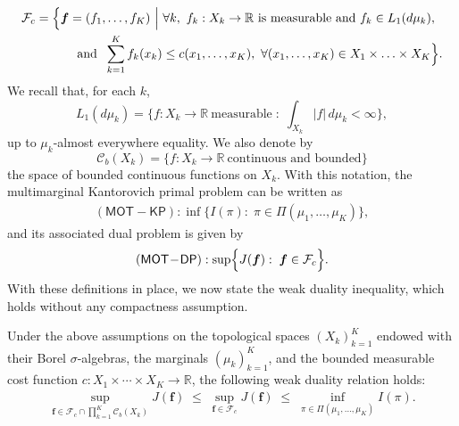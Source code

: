 \documentclass[twoside,11pt,a4paper]{article}
\begin{document}
\begin{equation*}\label{Fc}
\begin{aligned}
\mathcal F_c
=\;&
\Bigl\{
\boldsymbol f=(f_1,\ldots,f_K)\ \Big|\ 
\forall k,\ f_k:X_k\to\mathbb R \text{ is measurable and }
f_k\in L_1(d\mu_k),
\\
&\qquad
\text{and }\;
\sum_{k=1}^K f_k(x_k)\le c(x_1,\ldots,x_K),
\ \forall (x_1,\ldots,x_K) \in X_1 \times\ldots\times X_K
\Bigr\}.
\end{aligned}
\end{equation*}
We recall that, for each \(k\),
\[
L_1(d\mu_k)
=
\Big\{
f:X_k\to\mathbb R \ \text{measurable}
\;:\;
\int_{X_k}|f|\,d\mu_k<\infty
\Big\},
\]
up to \(\mu_k\)-almost everywhere equality. We also denote by
\[
\mathcal C_b(X_k)
=
\Big\{
f:X_k\to\mathbb R \ \text{continuous and bounded}
\Big\}
\]
the space of bounded continuous functions on \(X_k\). With this notation, the multimarginal Kantorovich primal problem can be written as
\begin{align*}
(\mathsf{MOT}\!-\!\mathsf{KP}):
\inf\bigl\{I(\pi):\;
\pi\in\Pi(\mu_1,\dots,\mu_K)\bigr\},
\end{align*}
and its associated dual problem is given by
\begin{align*}
(\mathsf{MOT}\!-\!\mathsf{DP}):
\sup\Bigl\{
J(\boldsymbol{f}):\;
\boldsymbol{f}\in\mathcal F_c
\Bigr\}.
\end{align*}
With these definitions in place, we now state the weak duality inequality, which holds without any compactness assumption.


\begin{lemma}\label{easyy}
Under the above assumptions on the topological spaces \((X_k)_{k=1}^K\)
endowed with their Borel \(\sigma\)-algebras, the marginals
\((\mu_k)_{k=1}^K\), and the bounded measurable cost function
\(c:X_1\times\cdots\times X_K\to\mathbb R\), the following weak duality relation holds:
\begin{align*}
\sup_{\boldsymbol f\in\mathcal F_c \cap \prod_{k=1}^K \mathcal C_b(X_k)}
J(\boldsymbol f)
\;\le\;
\sup_{\boldsymbol f\in\mathcal F_c}
J(\boldsymbol f)
\;\le\;
\inf_{\pi\in\Pi(\mu_1,\dots,\mu_K)} I(\pi).
\end{align*}
\end{lemma}
\end{document}
